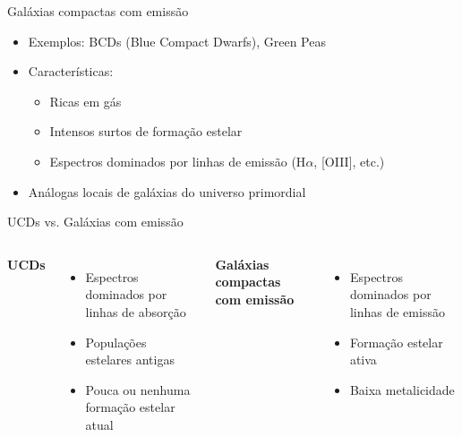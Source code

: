 \begin{frame}[c]{Galáxias compactas com emissão}
    \begin{itemize}
        \item Exemplos: BCDs (Blue Compact Dwarfs), Green Peas
        \item Características:
        \begin{itemize}
            \item Ricas em gás
            \item Intensos surtos de formação estelar
            \item Espectros dominados por linhas de emissão (H$\alpha$, [OIII], etc.)
        \end{itemize}
        \item Análogas locais de galáxias do universo primordial
    \end{itemize}
    \vspace{0.5cm}
    \centering
\end{frame}

\begin{frame}{UCDs vs. Galáxias com emissão}
    \begin{columns}
        \textbf{UCDs}
        \begin{itemize}
            \item Espectros dominados por linhas de absorção
            \item Populações estelares antigas
            \item Pouca ou nenhuma formação estelar atual
        \end{itemize}
        \textbf{Galáxias compactas com emissão}
        \begin{itemize}
            \item Espectros dominados por linhas de emissão
            \item Formação estelar ativa
            \item Baixa metalicidade
        \end{itemize}
    \end{columns}
\end{frame}



